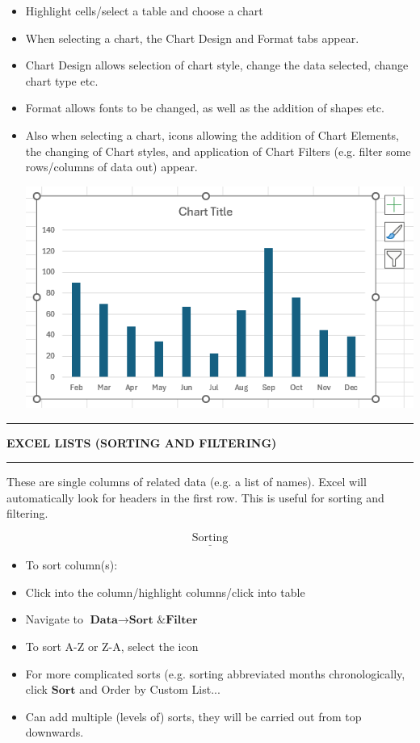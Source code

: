 \documentclass[8pt]{extarticle}
\newcommand{\heading}[1]{%
    \noindent
    \rule{\linewidth}{0.4pt}
    \begin{center}
        \vspace{-1ex}
        \textbf{#1}        
        \vspace{-2.5ex}
    \end{center}
    \rule{\linewidth}{0.4pt}
}
\begin{document}
\begin{multicols}{3}
\begin{itemize}
    \item Highlight cells/select a table and choose a chart
    \item When selecting a chart, the Chart Design and Format tabs appear. 
    \item Chart Design allows selection of chart style, change the data selected, change chart type etc.
    \item Format allows fonts to be changed, as well as the addition of shapes etc.
    \item Also when selecting a chart, icons allowing the addition of Chart Elements, the changing of Chart styles, and application of Chart Filters (e.g. filter some rows/columns of data out) appear.    
        \begin{center}
        \includegraphics[width=0.9\columnwidth]{images/chart_example.png}    
        \end{center}
\end{itemize}

\columnbreak
\heading{EXCEL LISTS (SORTING AND FILTERING)}

These are single columns of related data (e.g. a list of names). Excel will automatically look for headers in the first row. This is useful for sorting and filtering.

\[\underline{\text{Sorting}}\]

\begin{itemize}
    \item To sort column(s): 
    \item Click into the column/highlight columns/click into table
    \item Navigate to \( \textbf{Data} \rightarrow \textbf{Sort \& Filter} \)
    \item To sort A-Z or Z-A, select the icon
    \item For more complicated sorts (e.g. sorting abbreviated months chronologically, click $\textbf{Sort}$ and Order by Custom List...
    \item Can add multiple (levels of) sorts, they will be carried out from top downwards.
\end{itemize}


\end{multicols}
\end{document}
